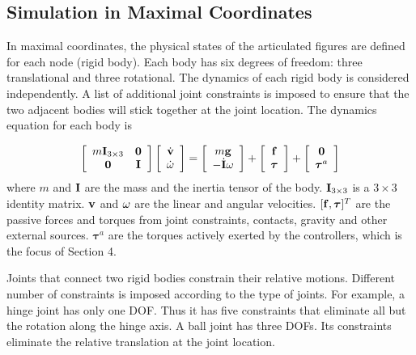 \subsection{Simulation in Maximal Coordinates}
In maximal coordinates, the physical states of the articulated figures are defined for each node (rigid body). Each body has six degrees of freedom: three translational and three rotational. The dynamics of each rigid body is considered independently. A list of additional joint constraints is imposed to ensure that the two adjacent bodies will stick together at the joint location. The dynamics equation for each body is 

\begin{equation}
\left[\begin{array}{cc}
m\vc{I}_{3\times3} & \vc{0} \\
\vc{0} & \vc{I}
\end{array}\right]
\left[\begin{array}{c}
\dot{\vc{v}} \\
\dot{\vc{\omega}}
\end{array}\right]=
\left[\begin{array}{c}
m\vc{g} \\
-\dot{\vc{I}}\vc{\omega}
\end{array}\right]
+\left[\begin{array}{c}
\vc{f}\\
\boldsymbol{\tau}
\end{array}\right]
+
\left[\begin{array}{c}
\vc{0}\\
\boldsymbol{\tau}^a
\end{array}\right]
\label{eq:dynamics}
\end{equation}
where $m$ and $\mathbf{I}$ are the mass and the inertia tensor of the body. $\mathbf{I}_{3\times 3}$ is a $3\times 3$ identity matrix. $\mathbf{v}$ and $\mathbf{\omega}$ are the linear and angular velocities. $[\mathbf{f}, \boldsymbol{\tau}]^T$ are the passive forces and torques from joint constraints, contacts, gravity and other external sources. $\boldsymbol{\tau}^a$ are the torques actively exerted by the controllers, which is the focus of Section 4.

Joints that connect two rigid bodies constrain their relative motions. Different number of constraints is imposed according to the type of joints. For example, a hinge joint has only one DOF. Thus it has five constraints that eliminate all but the rotation along the hinge axis. A ball joint has three DOFs. Its constraints eliminate the relative translation at the joint location. 

